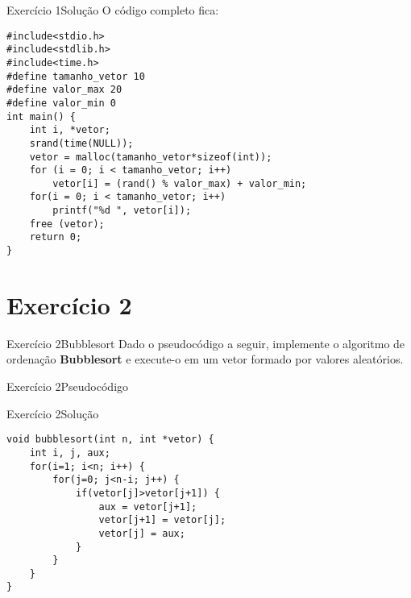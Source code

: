 \documentclass[aspectratio=169]{beamer}
\begin{document}

\begin{frame}[fragile]{Exercício 1}{Solução}
O código completo fica:
\begin{lstlisting}[style=CStyle]
#include<stdio.h>
#include<stdlib.h>
#include<time.h>
#define tamanho_vetor 10
#define valor_max 20
#define valor_min 0
int main() {
    int i, *vetor;
    srand(time(NULL));
    vetor = malloc(tamanho_vetor*sizeof(int));
    for (i = 0; i < tamanho_vetor; i++) 
        vetor[i] = (rand() % valor_max) + valor_min;
    for(i = 0; i < tamanho_vetor; i++)
        printf("%d ", vetor[i]);
    free (vetor);
    return 0;
}        
\end{lstlisting}  

\end{frame}

\section{Exercício 2}

\begin{frame}[fragile]{Exercício 2}{Bubblesort}
Dado o pseudocódigo a seguir, implemente o algoritmo de ordenação {\bf Bubblesort} e execute-o em um vetor formado por valores aleatórios.
\end{frame}


\begin{frame}[fragile]{Exercício 2}{Pseudocódigo}
\begin{algorithm}[H]
\caption{Bubblesort} 
\label{Bubblesort}
\end{algorithm}
\end{frame}

\begin{frame}[fragile]{Exercício 2}{Solução}
\begin{lstlisting}[style=CStyle]
void bubblesort(int n, int *vetor) {
    int i, j, aux;
    for(i=1; i<n; i++) {
        for(j=0; j<n-i; j++) {
            if(vetor[j]>vetor[j+1]) {
                aux = vetor[j+1];
                vetor[j+1] = vetor[j];
                vetor[j] = aux;
            }
        }
    }
}
\end{lstlisting}
\end{frame}
\end{document}
